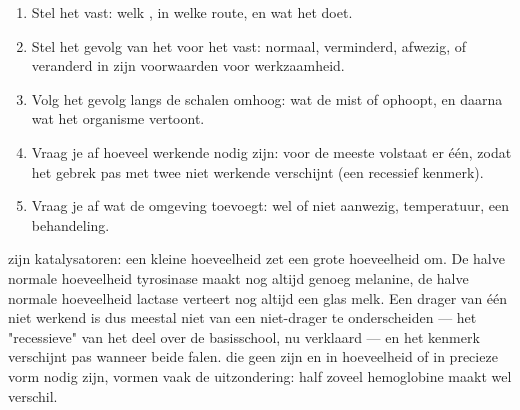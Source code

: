 \begin{method}\label{met:g11:enzymes-and-phenotype:reason}
\begin{enumerate}
  \item Stel het  vast: welk , in welke route, en wat het doet.
  \item Stel het gevolg van het  voor het  vast: normaal,
        verminderd, afwezig, of veranderd in zijn voorwaarden voor
        werkzaamheid.
  \item Volg het gevolg langs de schalen omhoog: wat de  mist of
        ophoopt, en daarna wat het organisme vertoont.
  \item Vraag je af hoeveel werkende  nodig zijn: voor de meeste
         volstaat er één, zodat het gebrek pas met twee niet
        werkende  verschijnt (een recessief kenmerk).
  \item Vraag je af wat de omgeving toevoegt:  wel of niet
        aanwezig, temperatuur, een behandeling.
\end{enumerate}
\end{method}

\begin{remark}\label{rem:g11:enzymes-and-phenotype:recessive}
 zijn katalysatoren: een kleine hoeveelheid zet een grote
hoeveelheid  om. De halve normale hoeveelheid tyrosinase maakt
nog altijd genoeg melanine, de halve normale hoeveelheid lactase verteert
nog altijd een glas melk. Een drager van één niet werkend  is dus
meestal niet van een niet-drager te onderscheiden --- het "recessieve"
van het deel over de basisschool, nu verklaard --- en het kenmerk
verschijnt pas wanneer beide  falen.  die geen  zijn
en in hoeveelheid of in precieze vorm nodig zijn, vormen vaak de
uitzondering: half zoveel hemoglobine maakt wel verschil.
\end{remark}

